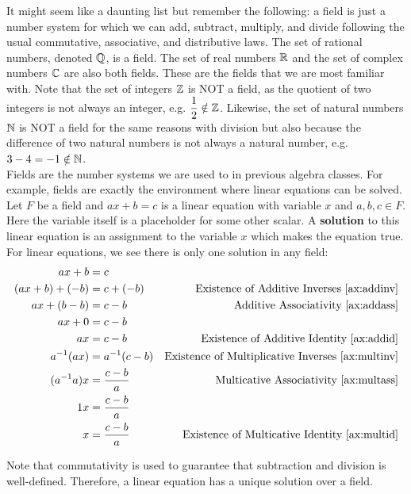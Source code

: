 It might seem like a daunting list but remember the following: a field is just a number system for which we can add, subtract, multiply, and divide following the usual commutative, associative, and distributive laws. The set of rational numbers, denoted $\mathbb{Q}$, is a field. The set of real numbers $\mathbb{R}$ and the set of complex numbers $\mathbb{C}$ are also both fields. These are the fields that we are most familiar with. Note that the set of integers $\mathbb{Z}$ is NOT a field, as the quotient of two integers is not always an integer, e.g. $\dfrac{1}{2}\notin \mathbb{Z}$. Likewise, the set of natural numbers $\mathbb{N}$ is NOT a field for the same reasons with division but also because the difference of two natural numbers is not always a natural number, e.g. $3-4 = -1 \notin \mathbb{N}$.\\

Fields are the number systems we are used to in previous algebra classes. For example, fields are exactly the environment where linear equations can be solved. Let $F$ be a field and $ax+b=c$ is a linear equation\label{note:lineareqn} with variable $x$ and $a,b,c\in F$. Here the variable itself is a placeholder for some other scalar. A \textbf{solution} to this linear equation is an assignment to the variable $x$ which makes the equation true. For linear equations, we see there is only one solution in any field:
\begin{align*}
ax+b&=c&\\
(ax+b)+(-b)&=c+(-b)& \text{Existence of Additive Inverses \eqref{ax:addinv}}\\
ax+(b-b)&=c-b& \text{Additive Associativity \eqref{ax:addass}}\\
ax+0&=c-b& \\
ax&=c-b& \text{Existence of Additive Identity \eqref{ax:addid}}\\
a^{-1}(ax)&=a^{-1}(c-b)& \text{Existence of Multiplicative Inverses \eqref{ax:multinv}}\\
(a^{-1}a)x&=\dfrac{c-b}{a}& \text{Multicative Associativity \eqref{ax:multass}}\\
1x&=\dfrac{c-b}{a}& \\
x&=\dfrac{c-b}{a}& \text{Existence of Multicative Identity \eqref{ax:multid}}\\
\end{align*}

Note that commutativity is used to guarantee that subtraction and division is well-defined. Therefore, a linear equation has a unique solution over a field.\\

